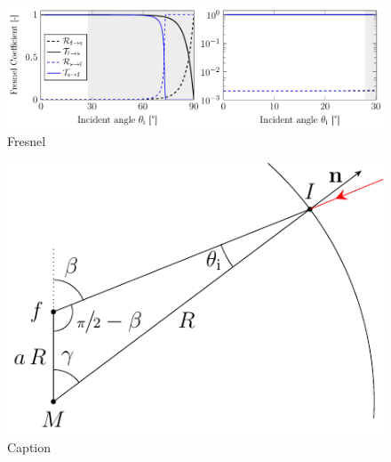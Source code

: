 \begin{figure}[htp]
  \centering
  \includegraphics[]{Plots/cache/Fresnel.pdf}
  \caption{Fresnel}
  \label{fig:Th-fresnel}
\end{figure}

\lipsum[1-2]

\begin{figure}[htp]
  \centering
  \includegraphics[]{Plots/cache/angles.pdf}
  \caption{Caption}
  \label{fig:Th-angles}
\end{figure}

\lipsum[1-2]

